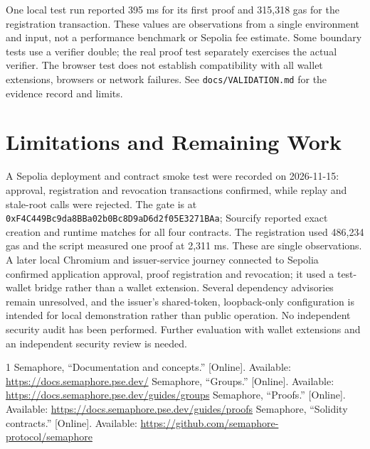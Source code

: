 \documentclass[conference]{IEEEtran}
\begin{document}
One local test run reported 395 ms for its first proof and 315,318 gas for the registration transaction. These values are observations from a single environment and input, not a performance benchmark or Sepolia fee estimate. Some boundary tests use a verifier double; the real proof test separately exercises the actual verifier. The browser test does not establish compatibility with all wallet extensions, browsers or network failures. See \texttt{docs/VALIDATION.md} for the evidence record and limits.

\section{Limitations and Remaining Work}
A Sepolia deployment and contract smoke test were recorded on 2026-11-15: approval, registration and revocation transactions confirmed, while replay and stale-root calls were rejected. The gate is at \texttt{0xF4C449Bc\allowbreak 9da8BBa0\allowbreak 2b0Bc8D9\allowbreak aD6d2f05\allowbreak E3271BAa}; Sourcify reported exact creation and runtime matches for all four contracts. The registration used 486,234 gas and the script measured one proof at 2,311 ms. These are single observations. A later local Chromium and issuer-service journey connected to Sepolia confirmed application approval, proof registration and revocation; it used a test-wallet bridge rather than a wallet extension. Several dependency advisories remain unresolved, and the issuer's shared-token, loopback-only configuration is intended for local demonstration rather than public operation. No independent security audit has been performed. Further evaluation with wallet extensions and an independent security review is needed.

\begin{thebibliography}{1}
 Semaphore, ``Documentation and concepts.'' [Online]. Available: \url{https://docs.semaphore.pse.dev/}
 Semaphore, ``Groups.'' [Online]. Available: \url{https://docs.semaphore.pse.dev/guides/groups}
 Semaphore, ``Proofs.'' [Online]. Available: \url{https://docs.semaphore.pse.dev/guides/proofs}
 Semaphore, ``Solidity contracts.'' [Online]. Available: \url{https://github.com/semaphore-protocol/semaphore}
\end{thebibliography}
\end{document}
